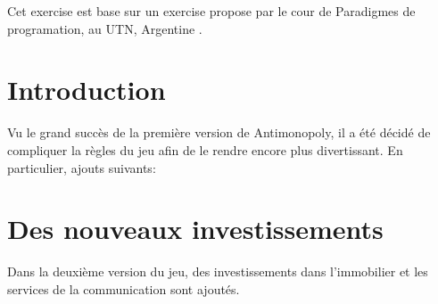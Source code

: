 \documentclass[12pt]{article}
\begin{document}
\maketitle
Cet exercise est base sur un exercise propose par le cour de Paradigmes de programation, au UTN, Argentine .

\section{Introduction}
Vu le grand succès de la première version de Antimonopoly, il a été décidé de compliquer la
règles du jeu afin de le rendre encore plus divertissant. En particulier,
ajouts suivants:


\section{Des nouveaux investissements}
Dans la deuxième version du jeu, des investissements dans l'immobilier et les services de la communication sont ajoutés.
\end{document}
